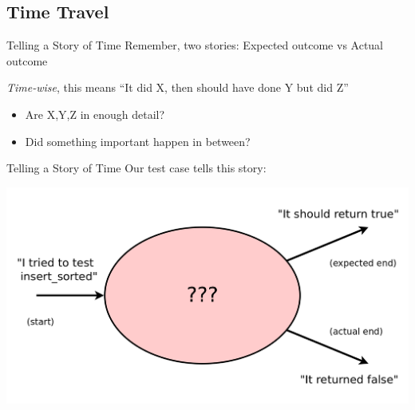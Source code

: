 \documentclass[xcolor=dvipsnames]{beamer}
\begin{document}
\subsection{Time Travel}


\begin{frame}{Telling a Story of Time}
	Remember, two stories: Expected outcome vs Actual outcome

	\linegap
	{\em Time-wise}, this means ``It did X, then should have done Y but did Z''
	\begin{itemize}
		\item Are X,Y,Z in enough detail?
		\item Did something important happen in between?
	\end{itemize}
\end{frame}

\begin{frame}{Telling a Story of Time}
	Our test case tells this story:

	\includegraphics[width=\textwidth]{time0.png}
\end{frame}
\end{document}
